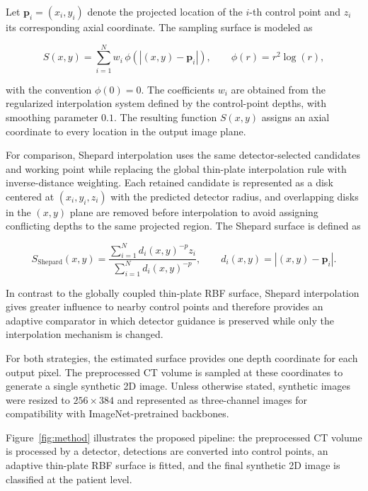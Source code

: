 \documentclass[preprint,12pt]{elsarticle}
\begin{document}
Let $\mathbf{p}_i=(x_i,y_i)$ denote the projected location of the $i$-th control point and $z_i$ its corresponding axial coordinate. The sampling surface is modeled as

\begin{equation}
S(x,y) =
\sum_{i=1}^{N} w_i\,
\phi\!\left(\left|(x,y)-\mathbf{p}_i\right|\right),
\qquad
\phi(r)=r^2\log(r),
\end{equation}

with the convention $\phi(0)=0$. The coefficients $w_i$ are obtained from the regularized interpolation system defined by the control-point depths, with smoothing parameter $0.1$. The resulting function $S(x,y)$ assigns an axial coordinate to every location in the output image plane.

For comparison, Shepard interpolation uses the same detector-selected candidates and working point while replacing the global thin-plate interpolation rule with inverse-distance weighting. Each retained candidate is represented as a disk centered at $(x_i,y_i,z_i)$ with the predicted detector radius, and overlapping disks in the $(x,y)$ plane are removed before interpolation to avoid assigning conflicting depths to the same projected region. The Shepard surface is defined as

\begin{equation}
S_{\mathrm{Shepard}}(x,y)=
\frac{
\sum_{i=1}^{N} d_i(x,y)^{-p} z_i
}{
\sum_{i=1}^{N} d_i(x,y)^{-p}
},
\qquad
d_i(x,y)=
\left|(x,y)-\mathbf{p}_i\right|.
\end{equation}

In contrast to the globally coupled thin-plate RBF surface, Shepard interpolation gives greater influence to nearby control points and therefore provides an adaptive comparator in which detector guidance is preserved while only the interpolation mechanism is changed.

For both strategies, the estimated surface provides one depth coordinate for each output pixel. The preprocessed CT volume is sampled at these coordinates to generate a single synthetic 2D image. Unless otherwise stated, synthetic images were resized to $256 \times 384$ and represented as three-channel images for compatibility with ImageNet-pretrained backbones.

Figure~\ref{fig:method} illustrates the proposed pipeline: the preprocessed CT volume is processed by a detector, detections are converted into control points, an adaptive thin-plate RBF surface is fitted, and the final synthetic 2D image is classified at the patient level.
\end{document}
